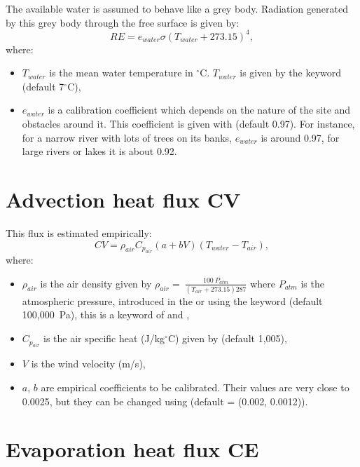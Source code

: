 The available water is assumed to behave like a grey body.
Radiation generated by this grey body through the free surface is given by:
\begin{equation*}
RE = e_{water}\sigma\left(T_{water}+273.15 \right)^4,
\end{equation*}
where:
\begin{itemize}
\item $T_{water}$ is the mean water temperature in ${}^\circ$C.
$T_{water}$ is given by the keyword  (default 7${}^\circ$C),
\item $e_{water}$ is a calibration coefficient which depends on the nature
of the site and obstacles around it.
This coefficient is given with
 (default 0.97).
For instance, for a narrow river with lots of trees on its banks,
$e_{water}$ is around 0.97, for large rivers or lakes it is about 0.92.
\end{itemize}


\section{Advection heat flux CV}

This flux is estimated empirically:
\begin{equation*}
CV=\rho_{air}C_{p_{air}}\left(a+bV \right)\left(T_{water}-T_{air} \right),
\end{equation*}
where:
\begin{itemize}
  \item $\rho_{air}$ is the air density given by
${\rho }_{air}=\ \frac{100\ P_{atm}}{\left(T_{air}+273.15\right)287}$
where $P_{atm}$ is the atmospheric pressure,
introduced in the  or using the keyword
 (default 100,000~Pa),
this is a keyword of  and ,
\item $C_{p_{air}}$ is the air specific heat (J/kg${}^\circ$C)
  given by  (default 1,005),
\item $V$ is the wind velocity (m/s),
\item $a$, $b$ are empirical coefficients to be calibrated.
Their values are very close to 0.0025, but they can be changed
using  (default = (0.002, 0.0012)).
\end{itemize}


\section{Evaporation heat flux CE}

